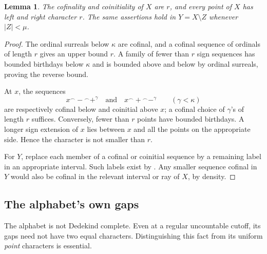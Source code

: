 \documentclass[11pt]{article}
\newtheorem{lemma}[lemma]{Lemma}
\theoremstyle{definition}
\theoremstyle{remark}
\newcommand{\cat}{\mathbin{{}^\frown}}
\begin{document}
\begin{lemma}\label{swo:gs:lem:alphabet-character}
The cofinality and coinitiality of $X$ are $r$, and every point of $X$ has
left and right character $r$. The same assertions hold in
$Y=X\setminus Z$ whenever $|Z|<\mu$.
\end{lemma}
\begin{proof}
The ordinal surreals below $\kappa$ are cofinal, and a cofinal sequence of
ordinals of length $r$ gives an upper bound $r$. A family of fewer than
$r$ sign sequences has bounded birthdays below $\kappa$ and is bounded
above and below by ordinal surreals, proving the reverse bound.

At $x$, the sequences
\[
 x\cat-\cat+^\gamma\quad\text{and}\quad
 x\cat+\cat-^\gamma \qquad(\gamma<\kappa)
\]
are respectively cofinal below and coinitial above $x$; a cofinal choice
of $\gamma$'s of length $r$ suffices. Conversely, fewer than $r$ points
have bounded birthdays. A longer sign extension of $x$ lies between
$x$ and all the points on the appropriate side. Hence the character is
not smaller than $r$.

For $Y$, replace each member of a cofinal or coinitial sequence by a
remaining label in an appropriate interval. Such labels exist by
. Any smaller sequence cofinal in $Y$ would
also be cofinal in the relevant interval or ray of $X$, by density.
\end{proof}

\subsection{The alphabet's own gaps}
The alphabet is not Dedekind complete. Even at a regular uncountable
cutoff, its gaps need not have two equal characters. Distinguishing this
fact from its uniform \emph{point} characters is essential.
\end{document}
